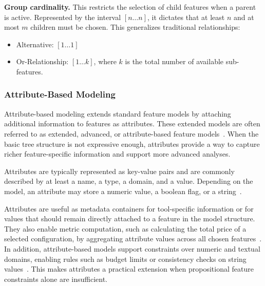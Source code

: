 \textbf{Group cardinality.}
This restricts the selection of child features when a parent is active.
Represented by the interval $[n \dots n]$, it dictates that at least $n$ and at most $m$ children must be chosen.
This generalizes traditional relationships:
\begin{itemize}
    \item Alternative: $[1 \dots 1]$
    \item Or-Relationship: $[1 \dots k]$, where $k$ is the total number of available sub-features.
\end{itemize}

\subsubsection{Attribute-Based Modeling}
\label{subsubsec:bg_feature_modeling_advancements_attributes}

Attribute-based modeling extends standard feature models by attaching additional information to features as attributes.
These extended models are often referred to as extended, advanced, or attribute-based feature models~\cite{benavides_automated_2010}.
When the basic tree structure is not expressive enough, attributes provide a way to capture richer feature-specific information and support more advanced analyses.

Attributes are typically represented as key-value pairs and are commonly described by at least a name, a type, a domain, and a value.
Depending on the model, an attribute may store a numeric value, a boolean flag, or a string~\cite{benavides_automated_2010, karatas_attribute-based_2016}.

Attributes are useful as metadata containers for tool-specific information or for values that should remain directly attached to a feature in the model structure.
They also enable metric computation, such as calculating the total price of a selected configuration, by aggregating attribute values across all chosen features~\cite{benavides_automated_2010}.
In addition, attribute-based models support constraints over numeric and textual domains, enabling rules such as budget limits or consistency checks on string values~\cite{karatas_attribute-based_2016}.
This makes attributes a practical extension when propositional feature constraints alone are insufficient.

